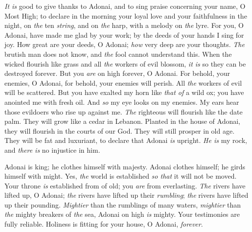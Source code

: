 \begin{biblechapter} %
 \textit{It is} good to give thanks to Adonai, 
and to sing praise concerning your name, O Most High;
\verse to declare in the morning your loyal love 
and your faithfulness in the night,
\verse on \textit{the} ten \textit{string}, and on \textit{the} harp, 
with a melody on \textit{the} lyre.
\verse For you, O Adonai, have made me glad by your work; 
by the deeds of your hands I sing for joy.
\verse How great are your deeds, O Adonai; 
\textit{how} very deep are your thoughts.
\verse \textit{The} brutish man does not know, 
and \textit{the} fool cannot understand this.
\verse When the wicked flourish like grass 
and all \textit{the} workers of evil blossom, 
\textit{it is} so they can be destroyed forever.
\verse But you \textit{are} on high forever, O Adonai.
\verse For behold, your enemies, O Adonai, 
for behold, your enemies will perish. 
All \textit{the} workers of evil will be scattered.
\verse But you have exalted my horn like \textit{that of} a wild ox; 
you have anointed me with fresh oil.
\verse And \textit{so} my eye looks on my enemies. 
My ears hear those evildoers who rise up against me.
\verse \textit{The} righteous will flourish like the date palm. 
They will grow like a cedar in Lebanon.
\verse Planted in the house of Adonai, 
they will flourish in the courts of our God.
\verse They will still prosper in old age. 
They will be fat and luxuriant,
\verse to declare that Adonai \textit{is} upright. 
\textit{He is} my rock, and \textit{there is} no injustice in him.
\end{biblechapter}

\begin{biblechapter} %
 Adonai is king; he clothes himself with majesty. 
Adonai clothes himself; he girds himself with might. 
Yes, \textit{the} world is established \textit{so that} it will not be moved.
\verse Your throne \textit{is} established from of old; 
you \textit{are} from everlasting.
\verse \textit{The} rivers have lifted up, O Adonai; 
\textit{the} rivers have lifted up their \textit{rumbling}; 
\textit{the} rivers have lifted up their pounding.
\verse \textit{Mightier} than the rumblings of many waters, 
\textit{mightier} than \textit{the} mighty breakers of \textit{the} sea, 
Adonai on high \textit{is} mighty.
\verse Your testimonies are fully reliable. 
Holiness is fitting for your house, 
O Adonai, \textit{forever}.
\end{biblechapter}

